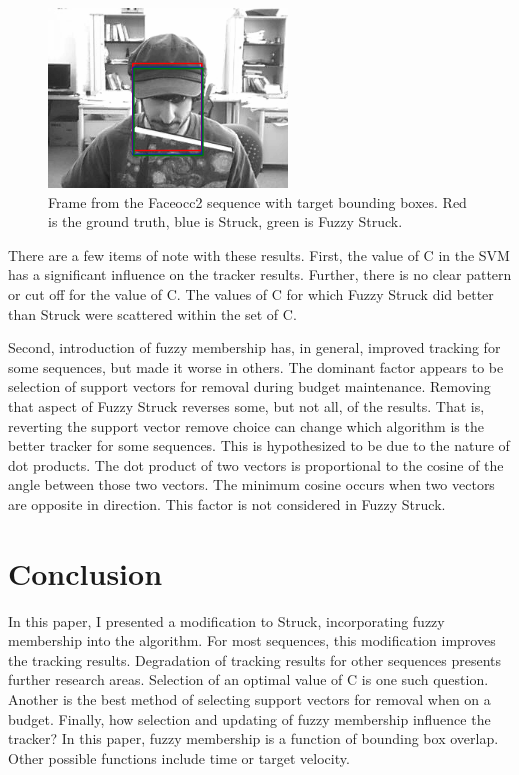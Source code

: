\documentclass{IEEEtran}
\begin{document}
\begin{figure}[!t]
    \centering
    \includegraphics[width=2.5in]{faceocc2.png}
    \caption{Frame from the Faceocc2 sequence with target bounding boxes. Red is the ground truth,
    blue is Struck, green is Fuzzy Struck.}
    \label{fig:faceocc2}
\end{figure}

There are a few items of note with these results. First, the value of C in the SVM has a significant
influence on the tracker results. Further, there is no clear pattern or cut off for the value of C.
The values of C for which Fuzzy Struck did better than Struck were scattered within the set of C.

Second, introduction of fuzzy membership has, in general, improved tracking for some sequences, but
made it worse in others. The dominant factor appears to be selection of support vectors for removal
during budget maintenance. Removing that aspect of Fuzzy Struck reverses some, but not all, of the
results. That is, reverting the support vector remove choice can change which algorithm is the
better tracker for some sequences. This is hypothesized to be due to the nature of dot products. The
dot product of two vectors is proportional to the cosine of the angle between those two vectors. The
minimum cosine occurs when two vectors are opposite in direction. This factor is not considered in
Fuzzy Struck.

\section{Conclusion} %
In this paper, I presented a modification to Struck, incorporating fuzzy membership into the
algorithm. For most sequences, this modification improves the tracking results. Degradation of
tracking results for other sequences presents further research areas. Selection of an optimal value
of C is one such question. Another is the best method of selecting support vectors for removal when
on a budget. Finally, how selection and updating of fuzzy membership influence the tracker? In this
paper, fuzzy membership is a function of bounding box overlap. Other possible functions include
time or target velocity.
\end{document}
